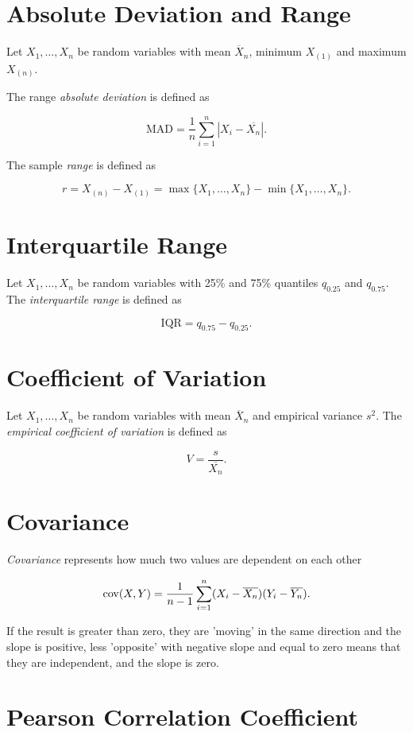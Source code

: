 \section{Absolute Deviation and Range}

Let \(X_1, \ldots, X_n\) be random variables with mean \(\overline{X}_n\), 
minimum \(X_{(1)}\) and maximum \(X_{(n)}\).

The range \emph{absolute deviation} is defined as

\[
    \mathrm{MAD} = \frac{1}{n} \sum_{i = 1}^{n} |X_i - \overline{X_n}|.
\]

The sample \emph{range} is defined as

\[
    r = X_{(n)} - X_{(1)} = \max\{X_1, \ldots, X_n\} - \min\{X_1, \ldots, X_n\}.
\]

\section{Interquartile Range}

Let \(X_1, \ldots, X_n\) be random variables with 25\% and 75\% quantiles
\(q_{0.25}\) and \(q_{0.75}\). The \emph{interquartile range} is defined as

\[
    \mathrm{IQR} = q_{0.75} - q_{0.25}.
\]

\section{Coefficient of Variation}

Let \(X_1, \ldots, X_n\) be random variables with mean \(\overline{X}_n\) and empirical variance \(s^2\). The \emph{empirical coefficient of variation}
is defined as

\[
    V = \frac{s}{\overline{X_n}}.
\]

\section{Covariance}

\emph{Covariance} represents how much two values are dependent on each other 

\[
    \mathrm{cov}(X, Y) = \frac{1}{n - 1} \sum_{i = 1}^{n}(X_i - \overline{X_n}) (Y_i - \overline{Y_n}).
\]

If the result is greater than zero, they are 'moving' in the same direction and the slope is positive, less 'opposite' with 
negative slope and equal to zero means that they are independent, and the slope is zero.

\section{Pearson Correlation Coefficient}

